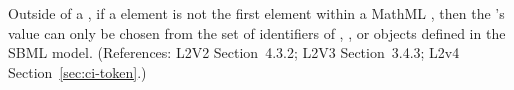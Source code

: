 Outside of a \FunctionDefinition, if a  element is not
the first element within a MathML , then the
's value can only be chosen from the set of identifiers
of \Species, \Compartment, \Parameter or \Reaction objects defined
in the SBML model.  (References: L2V2 Section~4.3.2; L2V3
Section~3.4.3; L2v4 Section~\ref{sec:ci-token}.)
